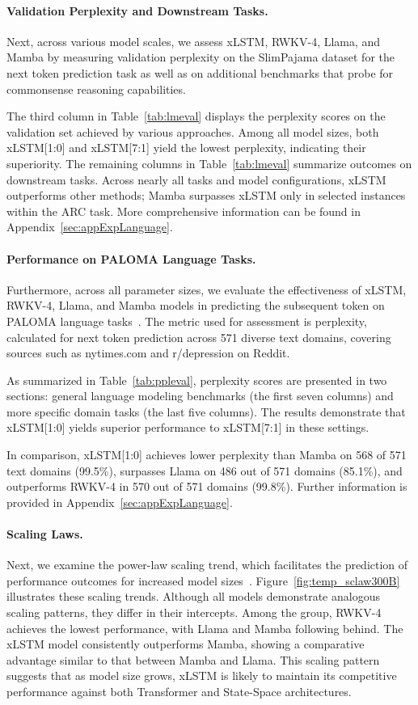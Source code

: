 \paragraph{Validation Perplexity and Downstream Tasks.}
\label{sec:spaj_downstream_eval}
Next, across various model scales, we assess xLSTM, RWKV-4, Llama, and Mamba by measuring validation perplexity on the SlimPajama dataset for the next token prediction task as well as on additional benchmarks that probe for commonsense reasoning capabilities.

The third column in Table~\ref{tab:lmeval} displays the perplexity scores on the validation set achieved by various approaches. Among all model sizes, both xLSTM[1:0] and xLSTM[7:1] yield the lowest perplexity, indicating their superiority. The remaining columns in Table~\ref{tab:lmeval} summarize outcomes on downstream tasks. Across nearly all tasks and model configurations, xLSTM outperforms other methods; Mamba surpasses xLSTM only in selected instances within the ARC task. More comprehensive information can be found in Appendix~\ref{sec:appExpLanguage}.

\paragraph{Performance on PALOMA Language Tasks.} Furthermore, across all parameter sizes, we evaluate the effectiveness of xLSTM, RWKV-4, Llama, and Mamba models in predicting the subsequent token on PALOMA language tasks~\citep{Magnusson:23arxivshort}. The metric used for assessment is perplexity, calculated for next token prediction across 571 diverse text domains, covering sources such as nytimes.com and r/depression on Reddit.

As summarized in Table~\ref{tab:ppleval}, perplexity scores are presented in two sections: general language modeling benchmarks (the first seven columns) and more specific domain tasks (the last five columns). The results demonstrate that xLSTM[1:0] yields superior performance to xLSTM[7:1] in these settings.

In comparison, xLSTM[1:0] achieves lower perplexity than Mamba on 568 of 571 text domains (99.5\%), surpasses Llama on 486 out of 571 domains (85.1\%), and outperforms RWKV-4 in 570 out of 571 domains (99.8\%). Further information is provided in Appendix~\ref{sec:appExpLanguage}.

\paragraph{Scaling Laws.} Next, we examine the power-law scaling trend, which facilitates the prediction of performance outcomes for increased model sizes~\citep{Kaplan:20,Brown:20short}. Figure~\ref{fig:temp_sclaw300B} illustrates these scaling trends. Although all models demonstrate analogous scaling patterns, they differ in their intercepts. Among the group, RWKV-4 achieves the lowest performance, with Llama and Mamba following behind. The xLSTM model consistently outperforms Mamba, showing a comparative advantage similar to that between Mamba and Llama. This scaling pattern suggests that as model size grows, xLSTM is likely to maintain its competitive performance against both Transformer and State-Space architectures.

